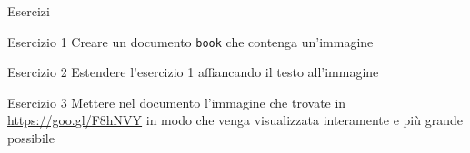 \begin{frame}{Esercizi}

\begin{block}{Esercizio 1}
Creare un documento \texttt{book} che contenga un'immagine
\end{block}

\begin{block}{Esercizio 2}
Estendere l'esercizio 1 affiancando il testo all'immagine
\end{block}

\begin{block}{Esercizio 3}
Mettere nel documento l'immagine che trovate in \url{https://goo.gl/F8hNVY} in
modo che venga visualizzata interamente e più grande possibile
\end{block}

\end{frame}